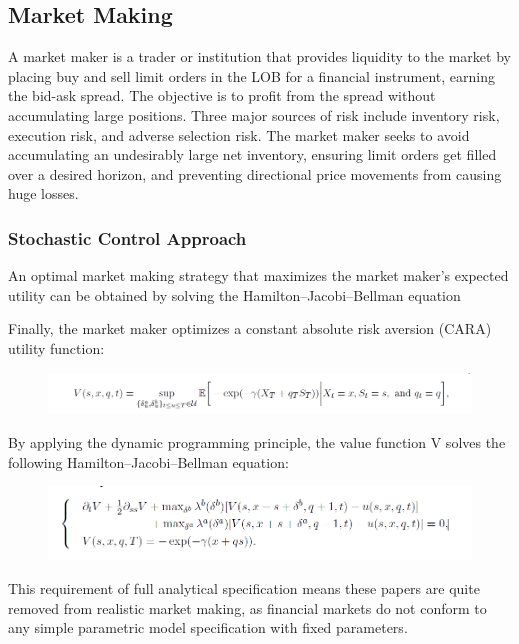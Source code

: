 \documentclass{article}
\begin{document}
\subsection{Market Making}
A market maker is a trader or institution that provides liquidity to the market by placing buy and sell limit orders in the LOB for a financial instrument, earning the bid-ask spread. The objective is to profit from the spread without accumulating large positions. Three major sources of risk include inventory risk, execution risk, and adverse selection risk. The market maker seeks to avoid accumulating an undesirably large net inventory, ensuring limit orders get filled over a desired horizon, and preventing directional price movements from causing huge losses.

\subsubsection{Stochastic Control Approach}
An optimal market making strategy that maximizes the market maker’s expected utility can be obtained by solving the Hamilton–Jacobi–Bellman equation

Finally, the market maker optimizes a constant absolute risk aversion (CARA) utility function:
\begin{figure}[H]
\begin{center}
\includegraphics[scale = 0.5]{Stoc1.png}
\end{center}
\end{figure}


By applying the dynamic programming principle, the value function V solves the following Hamilton–Jacobi–Bellman equation:
\begin{figure}[H]
\begin{center}
\includegraphics[scale = 0.5]{Stoc2.png}
\end{center}
\end{figure}

This requirement of full analytical specification means these papers are quite removed from realistic market making, as financial markets do not conform to any simple parametric model specification with fixed parameters.
\end{document}
